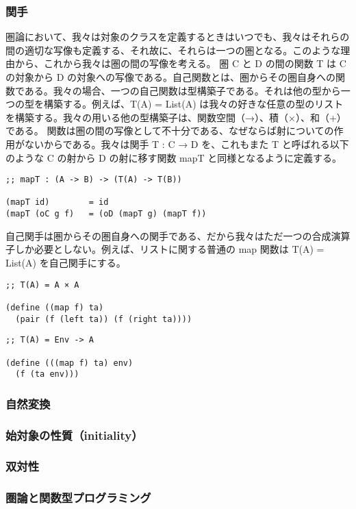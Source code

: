 \documentclass[11pt, oneside]{jsarticle}   	%
\begin{document}
\subsubsection{ 関手 }
圏論において、我々は対象のクラスを定義するときはいつでも、我々はそれらの間の適切な写像も定義する、それ故に、それらは一つの圏となる。このような理由から、これから我々は圏の間の写像を考える。
圏 C と D の間の関数 T は C の対象から D の対象への写像である。自己関数とは、圏からその圏自身への関数である。我々の場合、一つの自己関数は型構築子である。それは他の型から一つの型を構築する。例えば、T(A) = List(A) は我々の好きな任意の型のリストを構築する。我々の用いる他の型構築子は、関数空間（→）、積（×）、和（+）である。
関数は圏の間の写像として不十分である、なぜならば射についての作用がないからである。我々は関手 T : C → D を、これもまた T と呼ばれる以下のような C の射から D の射に移す関数 mapT と同様となるように定義する。
\begin{lstlisting}
;; mapT : (A -> B) -> (T(A) -> T(B))

(mapT id)        = id
(mapT (oC g f)   = (oD (mapT g) (mapT f))
\end{lstlisting}
自己関手は圏からその圏自身への関手である、だから我々はただ一つの合成演算子しか必要としない。例えば、リストに関する普通の map 関数は T(A) = List(A) を自己関手にする。

\begin{lstlisting}
;; T(A) = A × A

(define ((map f) ta)
  (pair (f (left ta)) (f (right ta))))
\end{lstlisting}

\begin{lstlisting}
;; T(A) = Env -> A

(define (((map f) ta) env)
  (f (ta env)))
\end{lstlisting}

\subsubsection{ 自然変換 }
\subsubsection{ 始対象の性質（initiality）}
\subsubsection{ 双対性 }
\subsubsection{ 圏論と関数型プログラミング }
\end{document}
